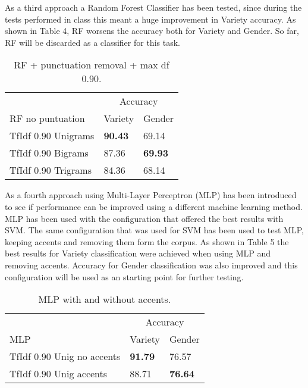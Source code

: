 \documentclass[11pt,a4paper]{article}
\begin{document}
As a third approach a Random Forest Classifier has been tested, since during the tests performed in class this meant a huge improvement in Variety accuracy. As shown in Table 4, RF worsens the accuracy both for Variety and Gender. So far, RF will be discarded as a classifier for this task.

\begin{table}[htbp]
\begin{center}
\begin{tabular}{|l|l|l|}
\hline
& \multicolumn{2}{c|}{Accuracy} \\
\cline{2-3}
RF no puntuation & Variety & Gender \\
\hline \hline
TfIdf 0.90 Unigrams & \textbf{90.43} & 69.14 \\ \hline
TfIdf 0.90 Bigrams & 87.36 & \textbf{69.93} \\ \hline
TfIdf 0.90 Trigrams & 84.36 & 68.14 \\ \hline
\end{tabular}
\caption{RF + punctuation removal + max df 0.90.}
\label{tabla:sencilla}
\end{center}
\end{table}

As a fourth approach using Multi-Layer Perceptron (MLP) has been introduced to see if performance can be improved using a different machine learning method. MLP has been used with the configuration that offered the best results with SVM. The same configuration that was used for SVM has been used to test MLP, keeping accents and removing them form the corpus. As shown in Table 5 the best results for Variety classification were achieved when using MLP and removing accents. Accuracy for Gender classification was also improved and this configuration will be used as an starting point for further testing.

\begin{table}[htbp]
\begin{center}
\begin{tabular}{|l|l|l|}
\hline
& \multicolumn{2}{c|}{Accuracy} \\
\cline{2-3}
MLP & Variety & Gender \\
\hline \hline
TfIdf 0.90 Unig no accents & \textbf{91.79} & 76.57 \\ \hline
TfIdf 0.90 Unig accents & 88.71 & \textbf{76.64} \\ \hline
\end{tabular}
\caption{MLP with and without accents.}
\label{tabla:sencilla}
\end{center}
\end{table}
\end{document}

